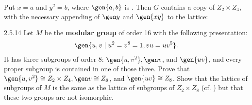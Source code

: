\begin{sol}
    Put $x = a$ and $y^2 = b$, where $\gen{a, b}$ is .
	Then $G$ contains a copy of $Z_2 \times Z_4$, with the necessary appending of $\gen y$ and $\gen{xy}$ to the lattice:
    \begin{center}
    \end{center}\vspace{-3ex}
\end{sol}

\begin{spex}{2.5.14} 
    Let $M$ be the \textbf{modular group} of order 16 with the following presentation:
    \[
    	\gen{u, v \mid u^2 = v^8 = 1, vu = uv^5}.
    \]
    It has three subgroups of order 8: $\gen{u, v^2}, \gen v$, and $\gen{uv}$, and every proper subgroup is contained in one of those three.
	Prove that $\gen{u, v^2} \cong Z_2 \times Z_4, \gen v \cong Z_8$, and $\gen{uv} \cong Z_8$.
	Show that the lattice of subgroups of $M$ is the same as the lattice of subgroups of $Z_2 \times Z_8$ (cf. ) but that these two groups are not isomorphic.
\end{spex}

